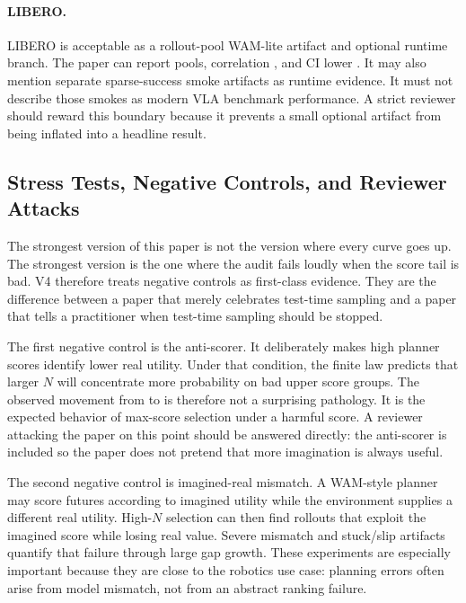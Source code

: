 \paragraph{LIBERO.}
LIBERO is acceptable as a rollout-pool WAM-lite artifact and optional runtime
branch. The paper can report \VFourWAMLiberoPools{} pools, correlation
\VFourWAMLiberoCorr{}, and CI lower \VFourWAMLiberoCILo{}. It may also
mention separate sparse-success smoke artifacts as runtime evidence. It must
not describe those smokes as modern VLA benchmark performance. A strict
reviewer should reward this boundary because it prevents a small optional
artifact from being inflated into a headline result.

\subsection{Stress Tests, Negative Controls, and Reviewer Attacks}
\label{app:stress-negative-controls}

The strongest version of this paper is not the version where every curve goes
up. The strongest version is the one where the audit fails loudly when the
score tail is bad. V4 therefore treats negative controls as first-class
evidence. They are the difference between a paper that merely celebrates
test-time sampling and a paper that tells a practitioner when test-time
sampling should be stopped.

The first negative control is the anti-scorer. It deliberately makes high
planner scores identify lower real utility. Under that condition, the finite
law predicts that larger $N$ will concentrate more probability on bad upper
score groups. The observed movement from \VFourWAMAntiScorerNOne{} to
\VFourWAMAntiScorerNSixtyFour{} is therefore not a surprising pathology. It
is the expected behavior of max-score selection under a harmful score. A
reviewer attacking the paper on this point should be answered directly: the
anti-scorer is included so the paper does not pretend that more imagination is
always useful.

The second negative control is imagined-real mismatch. A WAM-style planner may
score futures according to imagined utility while the environment supplies a
different real utility. High-$N$ selection can then find rollouts that exploit
the imagined score while losing real value. Severe mismatch and stuck/slip
artifacts quantify that failure through large gap growth. These experiments
are especially important because they are close to the robotics use case:
planning errors often arise from model mismatch, not from an abstract ranking
failure.

